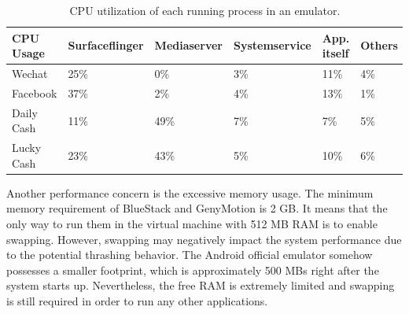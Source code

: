 \documentclass[conference]{IEEEtranl}
\begin{document}
		
		\begin{table}[t]
		\footnotesize
		\centering
		\caption{CPU utilization of each running process in an emulator.}
		\label{processcpu}
		\setlength\tabcolsep{0.4pt}
		\begin{tabular}{|l|l|l|l|l|l|}
		\hline
		CPU Usage  & Surfaceflinger & Mediaserver & Systemservice & App. itself & Others \\ \hline
		Wechat     & 25\%           & 0\%         & 3\%           & 11\%        & 4\%    \\ \hline
		Facebook   & 37\%           & 2\%         & 4\%           & 13\%        & 1\%    \\ \hline
		Daily Cash & 11\%           & 49\%        & 7\%           & 7\%         & 5\%    \\ \hline
		Lucky Cash & 23\%           & 43\%        & 5\%           & 10\%        & 6\%    \\ \hline
		
		\end{tabular}
		\vspace{-0.1in}
		\end{table}
			

	Another performance concern is the excessive memory usage. The minimum memory requirement of BlueStack and GenyMotion is 2 GB. It means that the only way to run them in the virtual machine with 512 MB RAM is to enable swapping. However, swapping may negatively impact the system performance due to the potential thrashing behavior. The Android official emulator somehow possesses a smaller footprint, which is approximately 500 MBs right after the system starts up. Nevertheless, the free RAM is extremely limited and swapping is still required in order to run any other applications. 

\end{document}
